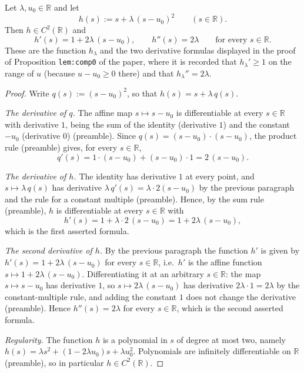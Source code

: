 \begin{lemma}
Let $\lambda,u_0\in\mathbb{R}$ and let
$$h(s):=s+\lambda\,(s-u_0)^2\qquad(s\in\mathbb{R}).$$
Then $h\in C^2(\mathbb{R})$ and
$$h'(s)=1+2\lambda\,(s-u_0),\qquad h''(s)=2\lambda\qquad\text{for every }s\in\mathbb{R}.$$
These are the function $h_\lambda$ and the two derivative formulas displayed in the proof of
Proposition \texttt{lem:comp0} of the paper, where it is recorded that $h_\lambda'\geq1$ on the
range of $u$ (because $u-u_0\geq0$ there) and that $h_\lambda''=2\lambda$.
\end{lemma}
\begin{proof}
Write $q(s):=(s-u_0)^2$, so that $h(s)=s+\lambda\,q(s)$.

\emph{The derivative of $q$.} The affine map $s\mapsto s-u_0$ is differentiable at every
$s\in\mathbb{R}$ with derivative $1$, being the sum of the identity (derivative $1$) and the
constant $-u_0$ (derivative $0$) (preamble). Since $q(s)=(s-u_0)\cdot(s-u_0)$, the product rule
(preamble) gives, for every $s\in\mathbb{R}$,
$$q'(s)=1\cdot(s-u_0)+(s-u_0)\cdot1=2\,(s-u_0).$$

\emph{The derivative of $h$.} The identity has derivative $1$ at every point, and
$s\mapsto\lambda\,q(s)$ has derivative $\lambda\,q'(s)=\lambda\cdot2(s-u_0)$ by the previous
paragraph and the rule for a constant multiple (preamble). Hence, by the sum rule (preamble),
$h$ is differentiable at every $s\in\mathbb{R}$ with
$$h'(s)=1+\lambda\cdot2\,(s-u_0)=1+2\lambda\,(s-u_0),$$
which is the first asserted formula.

\emph{The second derivative of $h$.} By the previous paragraph the function $h'$ is given by
$h'(s)=1+2\lambda\,(s-u_0)$ for every $s\in\mathbb{R}$, i.e.\ $h'$ is the affine function
$s\mapsto1+2\lambda\,(s-u_0)$. Differentiating it at an arbitrary $s\in\mathbb{R}$: the map
$s\mapsto s-u_0$ has derivative $1$, so $s\mapsto2\lambda\,(s-u_0)$ has derivative
$2\lambda\cdot1=2\lambda$ by the constant-multiple rule, and adding the constant $1$ does not
change the derivative (preamble). Hence $h''(s)=2\lambda$ for every $s\in\mathbb{R}$, which is
the second asserted formula.

\emph{Regularity.} The function $h$ is a polynomial in $s$ of degree at most two, namely
$h(s)=\lambda s^2+(1-2\lambda u_0)s+\lambda u_0^2$. Polynomials are infinitely differentiable on
$\mathbb{R}$ (preamble), so in particular $h\in C^2(\mathbb{R})$.
\end{proof}
